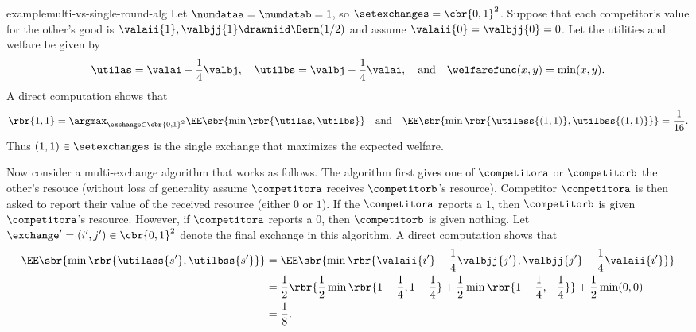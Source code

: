 \begin{restatable}{example}{multi-vs-single-round-alg}
    \label{ex:multi-vs-single-round-alg}
    Let $\numdataa=\numdatab=1$, so $\setexchanges=\cbr{0,1}^2$. Suppose that each competitor's value for the other's good is 
    $\valaii{1},\valbjj{1}\drawniid\Bern(1/2)$ and assume $\valaii{0}=\valbjj{0}=0$.
    Let the utilities and welfare be given by
    \begin{align*}
        \utilas
        =
        \valai-\frac{1}{4}\valbj,
        \quad 
        \utilbs
        =
        \valbj-\frac{1}{4}\valai,
        \quad
        \text{and}
        \quad
        \welfarefunc(x,y)=\min(x,y) .
    \end{align*}  
    A direct computation shows that 
    \begin{align*}
        \rbr{1,1} 
        =
        \argmax_{
            \exchange\in\cbr{0,1}^2
        }
        \EE\sbr{
            \min\rbr{
                \utilas,\utilbs
            }
        } 
        \quad
        \text{and}
        \quad
        \EE\sbr{
            \min\rbr{
                \utilass{(1,1)},\utilbss{(1,1)}
            }
        } 
        =
        \frac{1}{16} .
    \end{align*}  
    Thus $(1,1)\in\setexchanges$ is the single exchange that maximizes the expected welfare.

    Now consider a multi-exchange algorithm that works as follows. The algorithm first gives one of 
    $\competitora$ or $\competitorb$ the other's resouce (without loss of generality assume 
    $\competitora$ receives $\competitorb$'s resource). 
    Competitor $\competitora$ is then asked to report their value of the received resource
    (either $0$ or $1$). If the $\competitora$ reports a $1$, then $\competitorb$ is 
    given $\competitora$'s resource. 
    However, if $\competitora$ reports a $0$, then $\competitorb$ is given nothing.
    Let $\exchange'=(i',j')\in\cbr{0,1}^2$
    denote the final exchange in this algorithm. A direct computation shows that 
    \begin{align*}
        \EE\sbr{
            \min\rbr{
                \utilass{s'},\utilbss{s'}
            }
        } 
        &=
        \EE\sbr{
            \min\rbr{
                \valaii{i'}
                -
                \frac{1}{4}
                \valbjj{j'}
                ,
                \valbjj{j'}
                -
                \frac{1}{4}
                \valaii{i'}
            }
        } 
        \\
        &=
        \frac{1}{2}
        \rbr{
            \frac{1}{2}
            \min\rbr{
                1-\frac{1}{4}
                ,
                1-\frac{1}{4}
            }
            +
            \frac{1}{2}
            \min\rbr{
                1-\frac{1}{4}
                ,
                -\frac{1}{4}
            }
        }
        +
        \frac{1}{2}\min(0,0)
        \\
        &=
        \frac{1}{8} .
    \end{align*}  
\end{restatable}  

